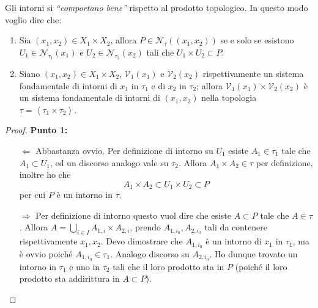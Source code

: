 \begin{theorem}
	Gli intorni si \emph{\enquote{comportano bene}} rispetto al prodotto topologico. In questo modo voglio dire che:
	\begin{enumerate}
		\item Sia $(x_1, x_2) \in X_1\times X_2$, allora $P \in \mathcal{N}_\tau((x_1,x_2))$ se e solo se esistono $U_1 \in \mathcal{N}_{\tau_1}(x_1)$ e $U_2 \in \mathcal{N}_{\tau_2}(x_2)$ tali che $U_1\times U_2 \subset P$.
		\item Siano $(x_1, x_2) \in X_1\times X_2$, $\mathcal{V}_1(x_1)$ e $\mathcal{V}_2(x_2)$ rispettivamente un sistema fondamentale di intorni di $x_1$ in $\tau_1$ e di $x_2$ in $\tau_2$; allora $\mathcal{V}_1(x_1) \times \mathcal{V}_2(x_2)$ è un sistema fondamentale di intorni di $(x_1, x_2)$ nella topologia $\tau = \left\langle \tau_1 \times \tau_2 \right\rangle$.
	\end{enumerate}	
\end{theorem}
\begin{proof} \textbf{Punto 1:}
	\begin{enumerate}
		\item[$\Leftarrow$] Abbastanza ovvio. Per definizione di intorno su $U_1$ esiste $A_1 \in \tau_1$ tale che $A_1 \subset U_1$, ed un discorso analogo vale su $\tau_2$. Allora $A_1 \times A_2 \in \tau$ per definizione, inoltre ho che 
		\begin{equation*}
			A_1 \times A_2 \subset U_1 \times U_2 \subset P
		\end{equation*}
		per cui $P$ è un intorno in $\tau$.
		\item[$\Rightarrow$] Per definizione di intorno questo vuol dire che esiste $A \subset P$ tale che $A \in \tau$. Allora $A = \bigcup_{i \in I} A_{1,i} \times A_{2,i}$, prendo $A_{1,i_0}, A_{2,i_0}$ tali da contenere rispettivamente $x_1, x_2$. Devo dimostrare che $A_{1,i_0}$ è un intorno di $x_1$ in $\tau_1$, ma è ovvio poiché $A_{1,i_0} \in \tau_1$. Analogo discorso su $A_{2,i_0}$. Ho dunque trovato un intorno in $\tau_1$ e uno in $\tau_2$ tali che il loro prodotto sta in $P$ (poiché il loro prodotto sta addirittura in $A \subset P$).
	\end{enumerate}
\end{proof}
